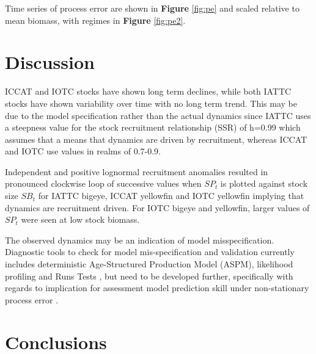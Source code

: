 \documentclass[12pt,doublespacing,a4paper]{ouparticle}
\begin{document}
Time series of process error are shown in \textbf{Figure} \ref{fig:pe} and scaled relative to mean biomass, with regimes in \textbf{Figure} \ref{fig:pe2}. 

\section{Discussion}

ICCAT and IOTC stocks have shown long term declines, while both IATTC stocks have shown variability over time with no long term trend. This may be due to the model specification rather than the actual dynamics since IATTC uses a steepness value for the stock recruitment relationship (SSR) of h=0.99 which assumes that a means that dynamics are driven by recruitment, whereas ICCAT and IOTC use values in realms of 0.7-0.9.

Independent and positive lognormal recruitment anomalies resulted in pronounced clockwise loop of successive values when $SP_t$ is plotted against stock size $SB_t$ for IATTC bigeye, ICCAT yellowfin and IOTC yellowfin implying that dynamics are recruitment driven. For IOTC bigeye and yellowfin, larger values of $SP_t$ were seen at low stock biomass. 

The observed dynamics may be an indication of model misspecification. Diagnostic tools to check for model mis-specification and validation currently includes  deterministic Age-Structured Production Model (ASPM), likelihood profiling \citep{lee2014use} and Runs Tests \citep{Maunder2015,Carvalho2017}, but need to be developed further, specifically with regards to implication for assessment model prediction skill under non-stationary process error \citep{kell2016evaluation,Chang2019}.



\section{Conclusions}

\end{document}
